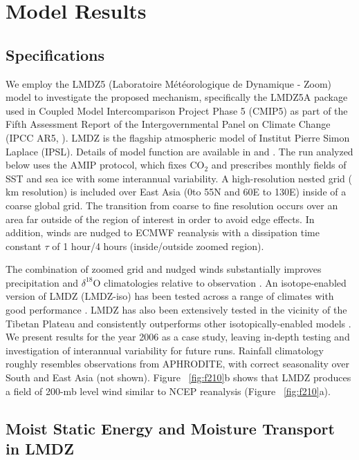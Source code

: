 \section{Model Results}

\subsection{Specifications}
	
	We employ the LMDZ5 (Laboratoire M\'et\'eorologique de Dynamique - Zoom) model to investigate the proposed mechanism, specifically the LMDZ5A package used in Coupled Model Intercomparison Project Phase 5 (CMIP5) as part of the Fifth Assessment Report of the Intergovernmental Panel on Climate Change (IPCC AR5, \cite{Christensen2011}). LMDZ is the flagship atmospheric model of Institut Pierre Simon Laplace (IPSL). Details of model function are available in \cite{Hourdin2006} and \cite{Hourdin2012}. The run analyzed below uses the AMIP protocol, which fixes CO$_\mathrm{2}$ and prescribes monthly fields of SST and sea ice with some interannual variability. A high-resolution nested grid ( km resolution) is included over East Asia (0\textdegree to 55\textdegree N and 60\textdegree E to 130\textdegree E) inside of a coarse global grid. The transition from coarse to fine resolution occurs over an area far outside of the region of interest in order to avoid edge effects. In addition, winds are nudged to ECMWF reanalysis with a dissipation time constant $\tau$ of 1 hour/4 hours (inside/outside zoomed region). 
	
	The combination of zoomed grid and nudged winds substantially improves precipitation and $\delta^{18}$O climatologies relative to observation \citep{Gao2011}. An isotope-enabled version of LMDZ (LMDZ-iso) has been tested across a range of climates with good performance \citep{Risi2010}. LMDZ has also been extensively tested in the vicinity of the Tibetan Plateau and consistently outperforms other isotopically-enabled models \citep{Gao2011,Lee2012,Eagle2013,Gao2013,Yao2013}. We present results for the year 2006 as a case study, leaving in-depth testing and investigation of interannual variability for future runs. Rainfall climatology roughly resembles observations from APHRODITE, with correct seasonality over South and East Asia (not shown). Figure ~\ref{fig:f210}b shows that LMDZ produces a field of 200-mb level wind similar to NCEP reanalysis (Figure ~\ref{fig:f210}a).
	
\subsection{Moist Static Energy and Moisture Transport in LMDZ}
	
